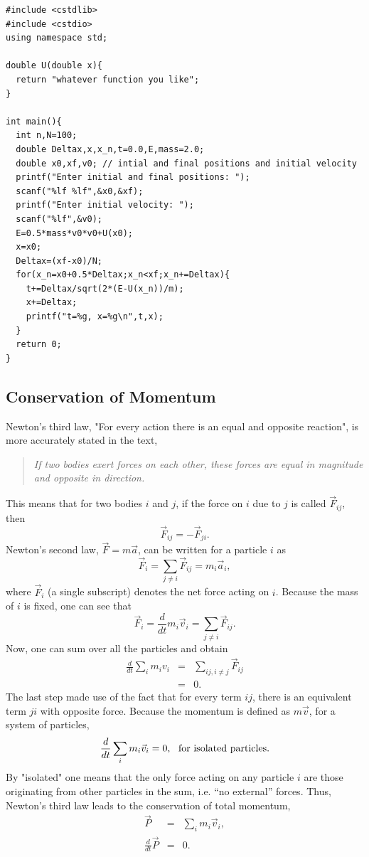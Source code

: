 {\tt\begin{verbatim}
#include <cstdlib>
#include <cstdio>
using namespace std;

double U(double x){
  return "whatever function you like";
}

int main(){
  int n,N=100;
  double Deltax,x,x_n,t=0.0,E,mass=2.0;
  double x0,xf,v0; // intial and final positions and initial velocity
  printf("Enter initial and final positions: ");
  scanf("%lf %lf",&x0,&xf);
  printf("Enter initial velocity: ");
  scanf("%lf",&v0);
  E=0.5*mass*v0*v0+U(x0);
  x=x0;
  Deltax=(xf-x0)/N;
  for(x_n=x0+0.5*Deltax;x_n<xf;x_n+=Deltax){
    t+=Deltax/sqrt(2*(E-U(x_n))/m);
    x+=Deltax;
    printf("t=%g, x=%g\n",t,x);
  }
  return 0;
}
\end{verbatim}}

\subsection{Conservation of Momentum}
\label{sec:momentum}

Newton's third law, "For every action there is an equal and opposite reaction", is more accurately stated in the text,
\begin{quote}
{\it If two bodies exert forces on each other, these forces are equal in magnitude and opposite in direction.}
\end{quote}
This means that for two bodies $i$ and $j$, if the force on $i$ due to $j$ is called $\vec{F}_{ij}$, then 
\begin{equation}
\vec{F}_{ij}=-\vec{F}_{ji}. 
\end{equation}
Newton's second law, $\vec{F}=m\vec{a}$, can be written for a particle $i$ as
\begin{equation}
\vec{F}_i=\sum_{j\ne i} \vec{F}_{ij}=m_i\vec{a}_i,
\end{equation}
where $\vec{F}_i$ (a single subscript) denotes the net force acting on $i$. Because the mass of $i$ is fixed, one can see that
\begin{equation}
\vec{F}_i=\frac{d}{dt}m_i\vec{v}_i=\sum_{j\ne i}\vec{F}_{ij}.
\end{equation}
Now, one can sum over all the particles and obtain
\begin{eqnarray}
\frac{d}{dt}\sum_i m_iv_i&=&\sum_{ij, i\ne j}\vec{F}_{ij}\\
\nonumber
&=&0.
\end{eqnarray}
The last step made use of the fact that for every term $ij$, there is an equivalent term $ji$ with opposite force. Because the momentum is defined as $m\vec{v}$, for a system of particles,
\begin{equation}
\frac{d}{dt}\sum_im_i\vec{v}_i=0,~~{\rm for~isolated~particles}.
\end{equation}
By "isolated" one means that the only force acting on any particle $i$ are those originating from other particles in the sum, i.e. ``no external'' forces. Thus, Newton's third law leads to the conservation of total momentum,
\begin{eqnarray}
\vec{P}&=&\sum_i m_i\vec{v}_i,\\
\nonumber
\frac{d}{dt}\vec{P}&=&0.
\end{eqnarray}


